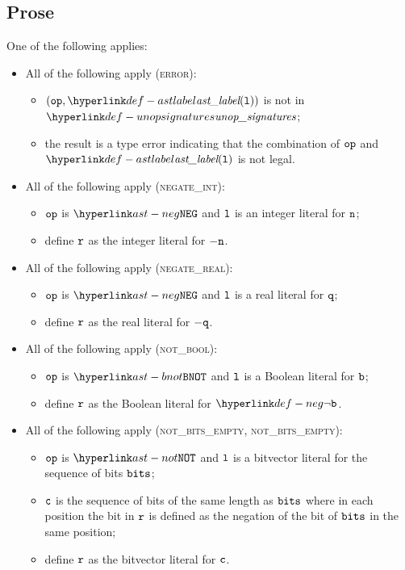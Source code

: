 \subsection{Prose}
One of the following applies:
\begin{itemize}
  \item All of the following apply (\textsc{error}):
  \begin{itemize}
    \item $(\op, \astlabel(\vl))$ is not in $\unopsignatures$;
    \item the result is a type error indicating that the combination of $\texttt{op}$ and $\astlabel(\vl)$
          is not legal.
  \end{itemize}

  \item All of the following apply (\textsc{negate\_int}):
  \begin{itemize}
    \item $\texttt{op}$ is $\NEG$ and $\texttt{l}$ is an integer literal for $\texttt{n}$;
    \item define $\texttt{r}$ as the integer literal for $- \texttt{n}$.
  \end{itemize}

  \item All of the following apply (\textsc{negate\_real}):
  \begin{itemize}
    \item $\texttt{op}$ is $\NEG$ and $\texttt{l}$ is a real literal for $\texttt{q}$;
    \item define $\texttt{r}$ as the real literal for $- \texttt{q}$.
  \end{itemize}

  \item All of the following apply (\textsc{not\_bool}):
  \begin{itemize}
    \item $\texttt{op}$ is $\BNOT$ and $\texttt{l}$ is a Boolean literal for $\texttt{b}$;
    \item define $\texttt{r}$ as the Boolean literal for $\neg\vb$.
  \end{itemize}

  \item All of the following apply (\textsc{not\_bits\_empty}, \textsc{not\_bits\_empty}):
  \begin{itemize}
    \item $\texttt{op}$ is $\NOT$ and $\texttt{l}$ is a bitvector literal for the sequence of bits $\texttt{bits}$;
    \item $\texttt{c}$ is the sequence of bits of the same length as $\texttt{bits}$ where in each position
          the bit in $\texttt{r}$ is defined as the negation of the bit of $\texttt{bits}$ in the same position;
    \item define $\texttt{r}$ as the bitvector literal for $\texttt{c}$.
  \end{itemize}
\end{itemize}

